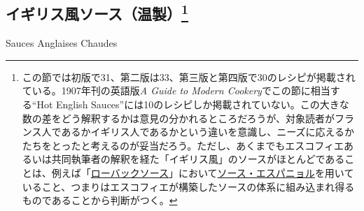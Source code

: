 
\begin{main}

\hypertarget{ux30a4ux30aeux30eaux30b9ux98a8ux30bdux30fcux30b9ux6e29ux88fd24}{%
\section[イギリス風ソース（温製）]{\texorpdfstring{イギリス風ソース（温製）\footnote{この節では初版で31、第二版は33、第三版と第四版で30のレシピが掲載されている。1907年刊の英語版\emph{A
  Guide to Modern Cookery}でこの節に相当する``Hot English
  Sauces''には10のレシピしか掲載されていない。この大きな数の差をどう解釈するかは意見の分かれるところだろうが、対象読者がフランス人であるかイギリス人であるかという違いを意識し、ニーズに応えるかたちをとったと考えるのが妥当だろう。ただし、あくまでもエスコフィエあるいは共同執筆者の解釈を経た「イギリス風」のソースがほとんどであることは、例えば「\protect\hyperlink{roe-buck-sauce}{ローバックソース}」において\protect\hyperlink{sauce-espagnole}{ソース・エスパニョル}を用いていること、つまりはエスコフィエが構築したソースの体系に組み込まれ得るものであることから判断がつく。}}{イギリス風ソース（温製）}}\label{ux30a4ux30aeux30eaux30b9ux98a8ux30bdux30fcux30b9ux6e29ux88fd24}}

\begin{frsecenv}

Sauces Anglaises Chaudes

\end{frsecenv}


\end{main}

